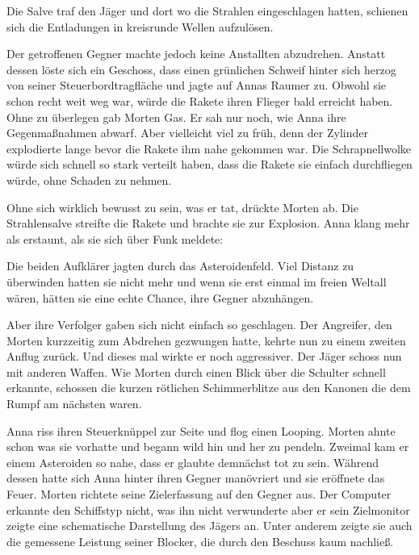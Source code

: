 Die Salve traf den Jäger und dort wo die Strahlen eingeschlagen hatten, schienen sich die Entladungen in kreisrunde Wellen aufzulösen.

\par

Der getroffenen Gegner machte jedoch keine Anstallten abzudrehen. Anstatt dessen löste sich ein Geschoss, dass einen grünlichen Schweif hinter sich herzog von seiner Steuerbordtragfläche und jagte auf Annas Raumer zu. Obwohl sie schon recht weit weg war, würde die Rakete ihren Flieger bald erreicht haben. Ohne zu überlegen gab Morten Gas. Er sah nur noch, wie Anna ihre Gegenmaßnahmen abwarf. Aber vielleicht viel zu früh, denn der Zylinder explodierte lange bevor die Rakete ihm nahe gekommen war. Die Schrapnellwolke würde sich schnell so stark verteilt haben, dass die Rakete sie einfach durchfliegen würde, ohne Schaden zu nehmen.

\par

Ohne sich wirklich bewusst zu sein, was er tat, drückte Morten ab. Die Strahlensalve streifte die Rakete und brachte sie zur Explosion. Anna klang mehr als erstaunt, als sie sich über Funk meldete: 

\par

Die beiden Aufklärer jagten durch das Asteroidenfeld. Viel Distanz zu überwinden hatten sie nicht mehr und wenn sie erst einmal im freien Weltall wären, hätten sie eine echte Chance, ihre Gegner abzuhängen.

\par

Aber ihre Verfolger gaben sich nicht einfach so geschlagen. Der Angreifer, den Morten kurzzeitig zum Abdrehen gezwungen hatte, kehrte nun zu einem zweiten Anflug zurück. Und dieses mal wirkte er noch aggressiver. Der Jäger schoss nun mit anderen Waffen. Wie Morten durch einen Blick über die Schulter schnell erkannte, schossen die kurzen rötlichen Schimmerblitze aus den Kanonen die dem Rumpf am nächsten waren.

\par

Anna riss ihren Steuerknüppel zur Seite und flog einen Looping. Morten ahnte schon was sie vorhatte und begann wild hin und her zu pendeln. Zweimal kam er einem Asteroiden so nahe, dass er glaubte demnächst tot zu sein. Während dessen hatte sich Anna hinter ihren Gegner manövriert und sie eröffnete das Feuer. Morten richtete seine Zielerfassung auf den Gegner aus. Der Computer erkannte den Schiffstyp nicht, was ihn nicht verwunderte aber er sein Zielmonitor zeigte eine schematische Darstellung des Jägers an. Unter anderem zeigte sie auch die gemessene Leistung seiner Blocker, die durch den Beschuss kaum nachließ.

